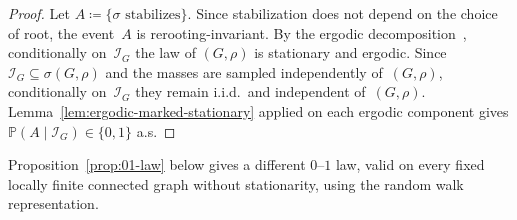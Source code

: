 \documentclass[11pt]{amsart}
\theoremstyle{plain}
\theoremstyle{definition}
\renewcommand{\P}{\mathbb{P}}
\begin{document}
	\begin{proof}
		Let $A\coloneqq\{\sigma\text{ stabilizes}\}$. Since stabilization does not depend on the choice of root, the event~$A$ is rerooting-invariant. By the ergodic decomposition~\citep[Section~2.1]{BenjaminiCurien12}, conditionally on~$\mathcal{I}_G$ the law of $(G,\rho)$ is stationary and ergodic. Since $\mathcal{I}_G\subseteq\sigma(G,\rho)$ and the masses are sampled independently of~$(G,\rho)$, conditionally on~$\mathcal{I}_G$ they remain i.i.d.\ and independent of~$(G,\rho)$. Lemma~\ref{lem:ergodic-marked-stationary} applied on each ergodic component gives $\P(A\mid\mathcal{I}_G)\in\{0,1\}$ a.s.
	\end{proof}
	
	Proposition~\ref{prop:01-law} below gives a different $0$--$1$ law, valid on every fixed locally finite connected graph without stationarity, using the random walk representation.
	
\end{document}
